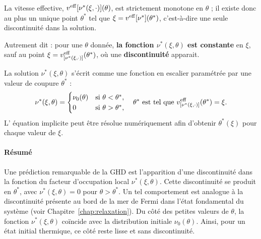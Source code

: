 \medskip

La vitesse effective, $v^{\rm eff}{[\nu^\ast(\xi , \cdot ) ]}(\theta)$, est strictement monotone en $\theta$ ; il existe donc au plus un unique point $\theta^\ast$ tel que $\xi = v^{\rm eff}{[\nu^\ast]}(\theta^\ast)$, c’est-à-dire une seule discontinuité dans la solution.


Autrement dit : pour une $\theta$ donnée, {\bf la fonction $\nu^\ast(\xi,\theta)$ est constante} en $\xi$, sauf au point $\xi = v^{\rm eff}_{[\nu^\ast(\xi , \cdot ) ]}(\theta^\ast)$, où une {\bf discontinuité} apparait.


\medskip

La solution $\nu^*(\xi,\theta)$ s’écrit comme une fonction en escalier paramétrée par une valeur de coupure $\theta^*$ :
\begin{equation}
    \label{eq:nuetoile}
    \nu^*(\xi,\theta) = 
    \begin{cases}
        \nu_0(\theta) & \text{si } \theta < \theta^*, \\
        0 & \text{si } \theta > \theta^*,
    \end{cases}
    \quad \text{$\theta^\ast$ est tel que } v^{\rm eff}_{[\nu^*(\xi,\cdot)]}(\theta^*) = \xi.
\end{equation}
L' équation implicite peut être résolue numériquement afin d'obtenir $\theta^\ast(\xi)$ pour chaque valeur de $\xi$. 

\paragraph{Résumé}

Une prédiction remarquable de la GHD est l’apparition d’une discontinuité dans la fonction du facteur d’occupation local $\nu^*(\xi,\theta)$. Cette discontinuité se produit en $\theta^*$, avec $\nu^*(\xi,\theta)=0$ pour $\theta>\theta^*$. Un tel comportement est analogue à la discontinuité présente au bord de la mer de Fermi dans l’état fondamental du système (voir Chapitre~\ref{chap:relaxation}). Du côté des petites valeurs de $\theta$, la fonction $\nu^*(\xi,\theta)$ coïncide avec la distribution initiale $\nu_0(\theta)$. Ainsi, pour un état initial thermique, ce côté reste lisse et sans discontinuité.  

